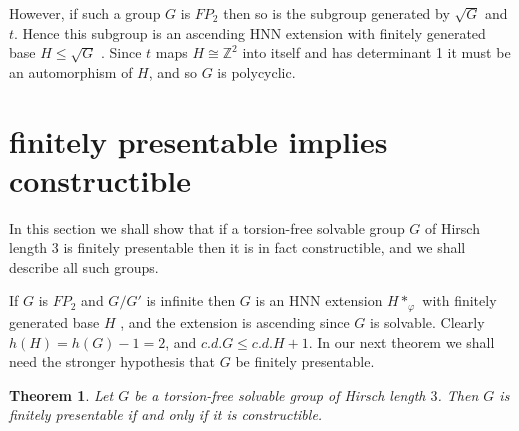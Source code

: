 \documentclass[12pt]{amsart}
\renewcommand{\leq}{\leqslant}
\newtheorem{theorem}{Theorem}
\begin{document}
However, 
if such a group $G$ is $FP_2$ then so is the subgroup generated by 
$\sqrt{G}$ and $t$.
Hence this subgroup is an ascending HNN extension 
with finitely generated base $H\leq\sqrt{G}$ \cite{BS78}.
Since $t$ maps $H\cong\mathbb{Z}^2$ into itself and has determinant 1 
it must be an automorphism of $H$, 
and so $G$ is polycyclic.

\section{finitely presentable implies constructible}

In this section we shall show that if  a torsion-free solvable group
$G$ of Hirsch length 3 is finitely presentable 
then it is in fact constructible,
and we shall describe all such groups.

If $G$ is $FP_2$ and $G/G'$ is infinite then $G$ is an HNN extension 
$H*_\varphi$ with finitely generated base $H$ \cite{BS78},
and the extension is ascending since $G$ is solvable.
Clearly $h(H)=h(G)-1=2$, and $c.d.G\leq{c.d.H+1}$.
In our next theorem we shall need the stronger hypothesis that $G$ be finitely presentable.


\begin{theorem}
\label{fpres-constructible}
Let $G$ be a torsion-free solvable group of Hirsch length $3$.
Then $G$ is finitely presentable if and only if it is constructible.
\end{theorem}
\end{document}
